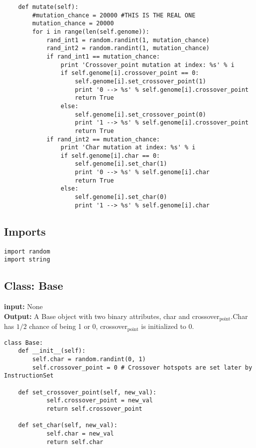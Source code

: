 \documentclass[a4paper]{article}
\begin{document}
\begin{verbatim}
    def mutate(self):
        #mutation_chance = 20000 #THIS IS THE REAL ONE
        mutation_chance = 20000
        for i in range(len(self.genome)):
            rand_int1 = random.randint(1, mutation_chance)
            rand_int2 = random.randint(1, mutation_chance)
            if rand_int1 == mutation_chance:
                print 'Crossover_point mutation at index: %s' % i
                if self.genome[i].crossover_point == 0:
                    self.genome[i].set_crossover_point(1)
                    print '0 --> %s' % self.genome[i].crossover_point
                    return True
                else:
                    self.genome[i].set_crossover_point(0)
                    print '1 --> %s' % self.genome[i].crossover_point
                    return True
            if rand_int2 == mutation_chance:
                print 'Char mutation at index: %s' % i
                if self.genome[i].char == 0:
                    self.genome[i].set_char(1)
                    print '0 --> %s' % self.genome[i].char
                    return True
                else:
                    self.genome[i].set_char(0) 
                    print '1 --> %s' % self.genome[i].char
\end{verbatim}
\subsection{Imports}
\label{sec-6-1}
\begin{verbatim}
import random
import string
\end{verbatim}
\subsection{Class: Base}
\label{sec-6-2}
\textbf{input:} None\\
\textbf{Output:} A Base object with two binary attributes, char and crossover$_{\text{point}}$.Char has $1/2$ chance of being 1 or 0, crossover$_{\text{point}}$ is initialized to 0.\\
\begin{verbatim}
class Base:
    def __init__(self):
        self.char = random.randint(0, 1)
        self.crossover_point = 0 # Crossover hotspots are set later by InstructionSet

    def set_crossover_point(self, new_val):
            self.crossover_point = new_val
            return self.crossover_point

    def set_char(self, new_val):
            self.char = new_val
            return self.char
\end{verbatim}
\end{document}

